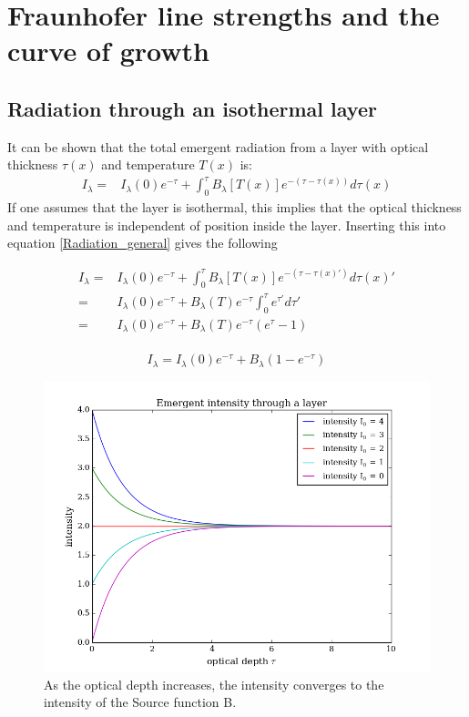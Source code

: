 \documentclass{aa}   %
\begin{document}
\section{Fraunhofer line strengths and the curve of growth}   \label{sec:Fraunhofer}


\subsection{Radiation through an isothermal layer}
It can be shown that the total emergent radiation from a layer with optical thickness $\tau(x)$ and temperature $T(x)$ is:
\begin{equation}\label{Radiation_general}
\begin{aligned}
 I_{\lambda} =& I_{\lambda}(0)e^{-\tau} + \int_0^\tau B_{\lambda}[T(x)]e^{-(\tau - \tau(x))}d\tau(x)
\end{aligned}
\end{equation}
If one assumes that the layer is isothermal, this implies that the optical thickness and temperature is independent of position inside the layer. Inserting this into equation \ref{Radiation_general} gives the following

\begin{equation*}
\begin{aligned}
I_{\lambda} =& I_{\lambda}(0)e^{-\tau} + \int_0^\tau B_{\lambda}[T(x)]e^{-(\tau - \tau(x)')}d\tau(x)'\\
	    =& I_{\lambda}(0)e^{-\tau} + B_{\lambda}(T)e^{-\tau}\int_0^\tau e^{\tau'}d\tau'\\
	    =& I_{\lambda}(0)e^{-\tau} + B_{\lambda}(T)e^{-\tau}(e^{\tau} - 1)\\
\end{aligned}
\end{equation*}

\begin{equation}\label{Radiation_isothermal}
 I_{\lambda} = I_{\lambda}(0)e^{-\tau} + B_{\lambda}(1 - e^{-\tau})
\end{equation}

\begin{figure}
\includegraphics[width=.49\textwidth]{emergent_original.png}
\caption{As the optical depth increases, the intensity converges to the intensity of the Source function B.}
\label{emergent_original}
\end{figure}
\end{document}
